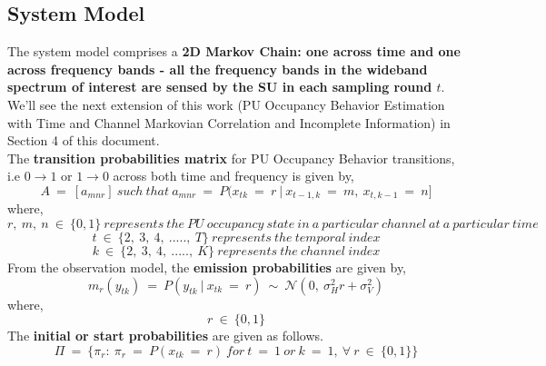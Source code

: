 \documentclass[12pt, draftcls, onecolumn]{IEEEtran}
\begin{document}
\subsection{System Model}
The system model comprises a \textbf{2D Markov Chain: one across time and one across frequency bands - all the frequency bands in the wideband spectrum of interest are sensed by the SU in each sampling round $t$}. We'll see the next extension of this work (PU Occupancy Behavior Estimation with Time and Channel Markovian Correlation and Incomplete Information) in Section 4 of this document.
\\The \textbf{transition probabilities matrix} for PU Occupancy Behavior transitions, i.e $0\longrightarrow1$ or $1\longrightarrow0$ across both time and frequency is given by,
\[A\ =\ [a_{mnr}]\ such\ that\ a_{mnr}\ =\ P(x_{tk}\ =\ r\ |\ x_{t-1,k}\ =\ m,\ x_{t,k-1}\ =\ n]\]
where,
\[r,\ m,\ n\ \in\ \{0,1\}\ represents\ the\ PU\ occupancy\ state\ in\ a\ particular\ channel\ at\ a\ particular\ time\]
\[t\ \in\ \{2,\ 3,\ 4,\ .....,\ T\}\ represents\ the\ temporal\ index\]
\[k\ \in\ \{2,\ 3,\ 4,\ .....,\ K\}\ represents\ the\ channel\ index\]
From the observation model, the \textbf{emission probabilities} are given by,
\[m_r(y_{tk})\ =\ P(y_{tk}\ |\ x_{tk}\ =\ r)\ \sim\ \mathcal{N}(0,\ \sigma_H^2r+\sigma_V^2)\]
where,
\[r\ \in\ \{0,1\}\]
The \textbf{initial or start probabilities} are given as follows.
\[\Pi\ =\ \{\pi_r:\ \pi_r\ =\ P(x_{tk}\ =\ r)\ for\ t\ =\ 1\ or\ k\ =\ 1,\ \forall\ r\ \in\ \{0,1\}\}\]
\end{document}
